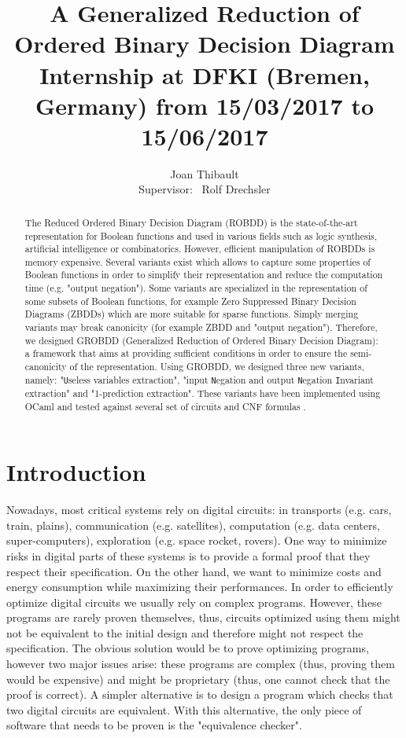 \documentclass[a4paper,10pt]{article}
\title{A Generalized Reduction of Ordered Binary Decision Diagram\\{\small Internship at DFKI (Bremen, Germany) from 15/03/2017 to 15/06/2017}}
\author{Joan Thibault\\Supervisor: ~Rolf Drechsler}
\newcommand{\Uextract}{"\texttt{U}seless variables extraction"}
\newcommand{\NNIextract}{"input \texttt{N}egation and output \texttt{N}egation \texttt{I}nvariant extraction"}
\newcommand{\Xextract}{"1-prediction extraction"}
\begin{document}
\maketitle
\begin{abstract}
The Reduced Ordered Binary Decision Diagram (ROBDD)\cite{Bryant1986, Somenzi1999} is the state-of-the-art representation for Boolean functions and used in various fields such as logic synthesis, artificial intelligence or combinatorics.
However, efficient manipulation of ROBDDs is memory expensive.
Several variants exist which allows to capture some properties of Boolean functions in order to simplify their representation and reduce the computation time (e.g. "output negation").
Some variants are specialized in the representation of some subsets of Boolean functions, for example Zero Suppressed Binary Decision Diagrams (ZBDDs) which are more suitable for sparse functions.
Simply merging variants may break canonicity (for example ZBDD and "output negation").
Therefore, we designed GROBDD (Generalized Reduction of Ordered Binary Decision Diagram): a framework that aims at providing sufficient conditions in order to ensure the semi-canonicity of the representation.
Using GROBDD, we designed three new variants, namely: \Uextract{}, \NNIextract{} and \Xextract{}.
These variants have been implemented using OCaml \cite{DAGamlGitHub} and tested against several set of circuits \cite{BenchSatlib, BenchLgsynth91} and CNF formulas \cite{BenchIscas99}.
\end{abstract}

\newpage

\section{Introduction}

Nowadays, most critical systems rely on digital circuits: in transports (e.g. cars, train, plains), communication (e.g. satellites), computation (e.g. data centers, super-computers), exploration (e.g. space rocket, rovers).
One way to minimize risks in digital parts of these systems is to provide a formal proof that they respect their specification.
On the other hand, we want to minimize costs and energy consumption while maximizing their performances.
In order to efficiently optimize digital circuits we usually rely on complex programs.
However, these programs are rarely proven themselves, thus, circuits optimized using them might not be equivalent to the initial design and therefore might not respect the specification.
The obvious solution would be to prove optimizing programs, however two major issues arise: these programs are complex (thus, proving them would be expensive) and might be proprietary (thus, one cannot check that the proof is correct).
A simpler alternative is to design a program which checks that two digital circuits are equivalent.
With this alternative, the only piece of software that needs to be proven is the "equivalence checker".
\end{document}
